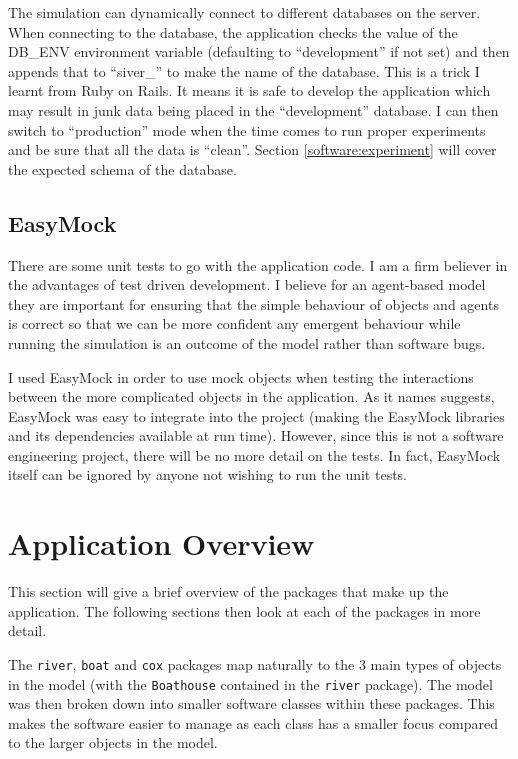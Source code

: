   The simulation can dynamically connect to different databases on the server. When connecting to the
  database, the application checks the value of the DB\_ENV
  environment variable (defaulting to ``development'' if not set) and then appends that to ``siver\_'' to make the
  name of the database. This is a trick I learnt from Ruby on
  Rails. It means it is safe to develop the application which may result
  in junk data being placed in the ``development'' database. I can then switch to ``production'' mode when the
  time comes to run proper experiments and be sure that
  all the data is ``clean''. Section \ref{software:experiment} will
  cover the expected schema of the database.


  \subsection{EasyMock}
  There are some unit tests to go with the application code. I am a
  firm believer in the advantages of test driven development. I
  believe for an agent-based model they are important for ensuring
  that the simple behaviour of objects and agents is correct so that
  we can be more confident any emergent behaviour while running the
  simulation is an outcome of the model rather than software
  bugs.

  I used EasyMock in order to use mock objects when testing the
  interactions between the more complicated objects in the
  application. As it names suggests, EasyMock was easy to integrate
  into the project (making the EasyMock libraries and its dependencies
  available at run time). However, since this is not a software
  engineering project, there will be no more detail on the tests. In
  fact, EasyMock itself can be ignored by anyone not wishing to run
  the unit tests.

\section{Application Overview}
This section will give a brief overview of the packages that make up
the application. The following sections then look at each of the
packages in more detail. 

The \texttt{river}, \texttt{boat} and \texttt{cox} packages map
naturally to the 3 main types of objects in the model (with the
\texttt{Boathouse} contained in the \texttt{river} package). The model was
then broken down into smaller software classes within these packages. This
makes the software easier to manage as each class has a smaller focus
compared to the larger objects in the model.

